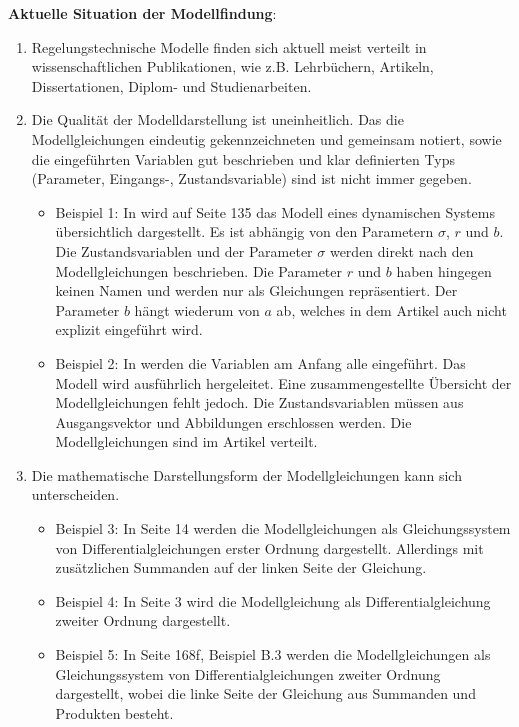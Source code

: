 \textbf{Aktuelle Situation der Modellfindung}: 
\begin{enumerate}
	\item Regelungstechnische Modelle finden sich aktuell meist verteilt in wissenschaftlichen Publikationen, wie z.B. Lehrbüchern, Artikeln, Dissertationen, Diplom- und Studienarbeiten.
	\item Die Qualität der Modelldarstellung ist uneinheitlich. Das die Modellgleichungen eindeutig gekennzeichneten und gemeinsam notiert, sowie die eingeführten Variablen gut beschrieben und klar definierten Typs (Parameter, Eingangs-, Zustandsvariable) sind ist nicht immer gegeben.
	\begin{itemize}[label=$\bullet$]
		\item Beispiel 1: In \cite{LOR63} wird auf Seite 135 das Modell eines dynamischen Systems übersichtlich dargestellt. Es ist abhängig von den Parametern $\sigma$, $r$ und $b$. Die Zustandsvariablen und der Parameter $\sigma$ werden direkt nach den Modellgleichungen beschrieben. Die Parameter $r$ und $b$ haben hingegen keinen Namen und werden nur als Gleichungen repräsentiert. Der Parameter $b$ hängt wiederum von $a$ ab, welches in dem Artikel auch nicht explizit eingeführt wird.
		\item Beispiel 2: In \cite{YIFREA09} werden die Variablen am Anfang alle eingeführt. Das Modell wird ausführlich hergeleitet. Eine zusammengestellte Übersicht der Modellgleichungen fehlt jedoch. Die Zustandsvariablen müssen aus Ausgangsvektor und Abbildungen erschlossen werden. Die Modellgleichungen sind im Artikel verteilt.
	\end{itemize}
	\item Die mathematische Darstellungsform der Modellgleichungen kann sich unterscheiden.
	\begin{itemize}[label=$\bullet$]
		\item Beispiel 3: In \cite{SILEEA12} Seite 14 werden die Modellgleichungen als Gleichungssystem von Differentialgleichungen erster Ordnung dargestellt. Allerdings mit zusätzlichen Summanden auf der linken Seite der Gleichung.
		\item Beispiel 4: In \cite{BUT21} Seite 3 wird die Modellgleichung als Differentialgleichung zweiter Ordnung dargestellt.
		\item Beispiel 5: In \cite{KNO16} Seite 168f, Beispiel B.3 werden die Modellgleichungen als Gleichungssystem von Differentialgleichungen zweiter Ordnung dargestellt, wobei die linke Seite der Gleichung aus Summanden und Produkten besteht.

\end{itemize}
\end{enumerate}
